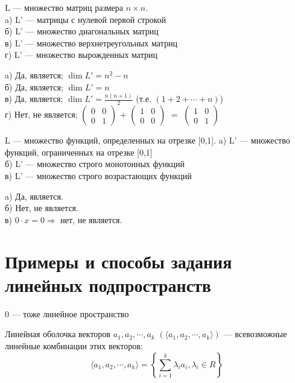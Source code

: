 \begin{prim}
	L --- множество матриц размера $n \times n$.\\
	a) L' --- матрицы с нулевой первой строкой\\
	б) L' --- множество диагональных матриц\\
	в) L' --- множество верхнетреугольных матриц\\
	г) L' --- множество вырожденных матриц\\
\end{prim}
a) Да, является;  $\dim  L'=n^2-n$\\
б) Да, является;  $\dim  L'=n$\\
в) Да, является;  $\dim  L'=\frac{n(n+1)}{2}$   (т.е. $(1+2+\cdots +n)$) \\
г) Нет, не является;
$\left( %
\begin{smallmatrix}
0&0 \\
0&1 
\end{smallmatrix} 
\right)$  
$+$
$\left(
\begin{smallmatrix}
1&0 \\
0&0 
\end{smallmatrix} 
\right)$  
$=$
$\left(
\begin{smallmatrix}
1&0 \\
0&1 
\end{smallmatrix} 
\right)$  
\\

\begin{prim}
	L --- множество функций, определенных на отрезке [0,1].
	a) L' --- множество функций, ограниченных на отрезке [0,1]\\
	б) L' --- множество строго монотонных функций\\
	в) L' --- множество строго возрастающих функций\\
\end{prim}
a) Да, является. \\
б) Нет, не является. \\
в) $0\cdot x = 0 \Longrightarrow$ нет, не является. \\

\section{Примеры и способы задания линейных подпространств}

0 --- тоже линейное пространство
\begin{definition}
	Линейная оболочка векторов $a_1, a_2, \cdots , a_k$  $(\langle a_1, a_2, \cdots , a_k\rangle )$ --- всевозможные линейные комбинации этих векторов:
	$$\langle a_1, a_2, \cdots , a_k\rangle =\left\{ \sum\limits^k _{i= 1} \lambda_i  a_i  , \lambda_i \in R \right\}$$ 
\end{definition}

